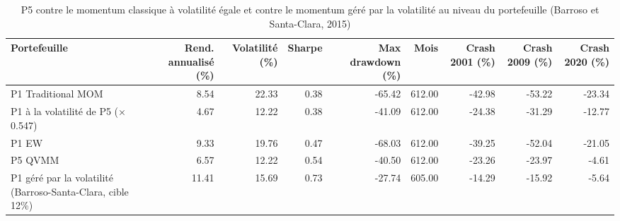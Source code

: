 \begin{table}[htbp]
\centering
\small
\caption{P5 contre le momentum classique à volatilité égale et contre le momentum géré par la volatilité au niveau du portefeuille (Barroso et Santa-Clara, 2015)}
\label{tab:T12_volatilite_egale}
\begin{tabular}{lrrrrrrrr}
\toprule
Portefeuille & Rend. annualisé (\%) & Volatilité (\%) & Sharpe & Max drawdown (\%) & Mois & Crash 2001 (\%) & Crash 2009 (\%) & Crash 2020 (\%) \\
\midrule
P1 Traditional MOM & 8.54 & 22.33 & 0.38 & -65.42 & 612.00 & -42.98 & -53.22 & -23.34 \\
P1 à la volatilité de P5 (× 0.547) & 4.67 & 12.22 & 0.38 & -41.09 & 612.00 & -24.38 & -31.29 & -12.77 \\
P1 EW & 9.33 & 19.76 & 0.47 & -68.03 & 612.00 & -39.25 & -52.04 & -21.05 \\
P5 QVMM & 6.57 & 12.22 & 0.54 & -40.50 & 612.00 & -23.26 & -23.97 & -4.61 \\
P1 géré par la volatilité (Barroso-Santa-Clara, cible 12\%) & 11.41 & 15.69 & 0.73 & -27.74 & 605.00 & -14.29 & -15.92 & -5.64 \\
\bottomrule
\end{tabular}
\end{table}